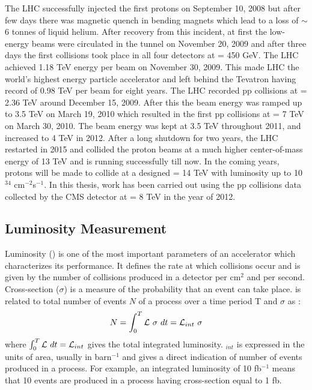 The LHC successfully injected the first protons on September 10, 2008 but after few days there was magnetic quench in bending magnets which lead to a loss of $\sim$6 tonnes of liquid helium. After recovery from this incident, at first the low-energy beams were circulated in the tunnel on November 20, 2009 and after three days the first collisions took place in all four detectors at \cme = 450 GeV. The LHC achieved 1.18 TeV energy per beam on November 30, 2009. This made LHC the world’s highest energy particle accelerator and left behind the Tevatron having record of 0.98 TeV per beam for eight years. The LHC recorded pp collisions at \cme = 2.36 TeV around December 15, 2009. After this the beam energy was ramped up to 3.5 TeV on March 19, 2010 which resulted in the first pp collisions at \cme = 7 TeV on March 30, 2010. The beam energy was kept at 3.5 TeV throughout 2011, and increased to 4 TeV in 2012. After a long shutdown for two years, the LHC restarted in 2015 and collided the proton beams at a much higher center-of-mass energy of 13 TeV and is running successfully till now. In the coming years, protons will be made to collide at a designed \cme = 14 TeV with luminosity up to 10$^{34}$ cm$^{-2}$s$^{-1}$. In this thesis, work has been carried out using the pp collisions data collected by the CMS detector at \cme = 8 TeV in the year of 2012.

\subsection{Luminosity Measurement}
\label{sec:lumi}
Luminosity (\lumi) is one of the most important parameters of an accelerator which characterizes its performance. It defines the rate at which collisions occur and is given by the number of collisions produced in a detector per cm$^2$ and per second. Cross-section ($\sigma$) is a measure of the probability that an event can take place. \lumi is related to total number of events $N$ of a process over a time period T and $\sigma$ as :
\begin{equation}
N = \int_{0}^{T} \mathcal{L}~\sigma~dt = \mathcal{L}_{int}~\sigma
\end{equation}
where $\int_{0}^{T} \mathcal{L}~dt = \mathcal{L}_{int}$ gives the total integrated luminosity. \lumi$_{int}$ is expressed in the units of area, usually in barn$^{-1}$ and gives a direct indication of number of events produced in a process. For example, an integrated luminosity of 10 fb$^{-1}$ means that 10 events are produced in a process having cross-section equal to 1 fb.

